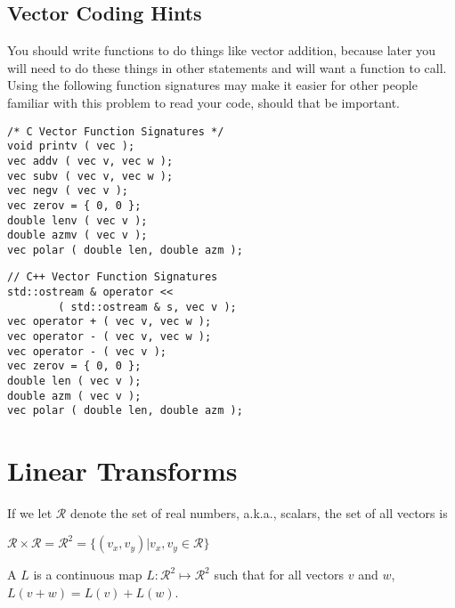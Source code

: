 \documentclass[12pt]{article}
\begin{document}
\subsection{Vector Coding Hints}

You should write functions to do things like vector addition,
because later you will need to do these things in other
statements and will want a function to call.  Using the following
function signatures may make it easier
for other people familiar with this problem to read your
code, should that be important.

\hspace*{0.5in}\begin{minipage}{4.0in}
\begin{verbatim}
/* C Vector Function Signatures */
void printv ( vec );
vec addv ( vec v, vec w );
vec subv ( vec v, vec w );
vec negv ( vec v );
vec zerov = { 0, 0 };
double lenv ( vec v );
double azmv ( vec v );
vec polar ( double len, double azm );
\end{verbatim}
\end{minipage}

\bigskip

\hspace*{0.5in}\begin{minipage}{4.0in}
\begin{verbatim}
// C++ Vector Function Signatures
std::ostream & operator <<
        ( std::ostream & s, vec v );
vec operator + ( vec v, vec w );
vec operator - ( vec v, vec w );
vec operator - ( vec v );
vec zerov = { 0, 0 };
double len ( vec v );
double azm ( vec v );
vec polar ( double len, double azm );
\end{verbatim}
\end{minipage}

\section{Linear Transforms}
If we let $\mathcal{R}$ denote the set of real numbers,
a.k.a., scalars, the set of all vectors is \\
\centerline{
$\mathcal{R}\times\mathcal{R}=\mathcal{R}^2
    =\{(v_x,v_y)|v_x,v_y\in \mathcal{R}\}$}

\begin{definition}\label{LINEAR-TRANSFORMATION}
A  $L$ is a continuous map
$L:\mathcal{R}^2\mapsto\mathcal{R}^2$ such that for
all vectors $v$ and $w$, $L(v+w)=L(v)+L(w)$.
\end{definition}
\end{document}

